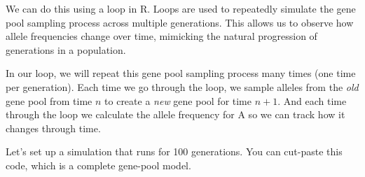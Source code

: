 \documentclass[
  a4paper]{book}
\begin{document}
We can do this using a loop in R. Loops are used to repeatedly simulate the gene pool sampling process across multiple generations. This allows us to observe how allele frequencies change over time, mimicking the natural progression of generations in a population.

In our loop, we will repeat this gene pool sampling process many times (one time per generation). Each time we go through the loop, we sample alleles from the \emph{old} gene pool from time \(n\) to create a \emph{new} gene pool for time \(n+1\). And each time through the loop we calculate the allele frequency for A so we can track how it changes through time.

Let's set up a simulation that runs for 100 generations.
You can cut-paste this code, which is a complete gene-pool model.
\end{document}
